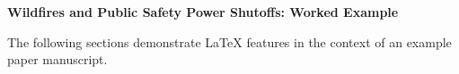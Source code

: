 \documentclass[../main.tex]{subfiles}
\begin{document}
\vspace*{\fill}
\begin{center}
\textbf{\Large Wildfires and Public Safety Power Shutoffs: Worked Example}

\vspace{1em}

The following sections demonstrate \LaTeX{} features in the context of an example paper manuscript.
\end{center}
\vspace*{\fill}

\clearpage
\end{document}
